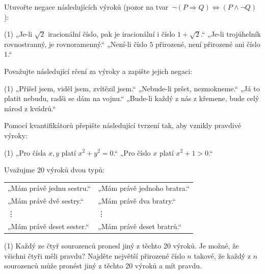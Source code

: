 \documentclass[12pt,a4paper]{article}
\begin{document}
\begin{exercise}
Utuvořte negace následujících výroků (pozor na tvar \,$\neg(P\Rightarrow Q)\Leftrightarrow (P\land\neg Q)$):
\begin{tasks}(1)
\task „Je-li $\sqrt{2}$ iracionální číslo, pak je iracionální i číslo $1+\sqrt{2}$.“
\task „Je-li trojúhelník rovnostranný, je rovnoramenný.“
\task „Není-li číslo $5$ přirozené, není přirozené ani číslo $1$.“
\end{tasks}
\end{exercise}

\begin{exercise}
Považujte následující rčení za výroky a zapište jejich negaci:
\begin{tasks}(1)
\task „Přišel jsem, viděl jsem, zvítězil jsem.“  
\task „Nebude-li pršet, nezmokneme.“  
\task „Já to platit nebudu, radši se dám na vojnu.“  
\task „Bude-li každý z nás z křemene, bude celý národ z kvádrů.“  
\end{tasks}
\end{exercise}

\begin{exercise}
Pomocí kvantifikátorů přepište následující tvrzení tak, aby vznikly pravdivé výroky:
\begin{tasks}(1)
\task „Pro čísla $x,y$ platí $x^2 + y^2 = 0$.“  
\task „Pro číslo $x$ platí $x^2 + 1 > 0$.“  
\end{tasks}
\end{exercise}


\setcounter{section}{2}

\begin{exercise}
Uvažujme 20 výroků dvou typů:

\begin{center}
\begin{tabular}{ll}
„Mám právě jednu sestru.“ & „Mám právě jednoho bratra.“ \\
„Mám právě dvě sestry.“   & „Mám právě dva bratry.“    \\
\vdots                    & \vdots                     \\
„Mám právě deset sester.“ & „Mám právě deset bratrů.“  \\
\end{tabular}
\end{center}

\begin{tasks}(1)
    \task Každý ze čtyř sourozenců pronesl jiný z těchto 20 výroků.  
          Je možné, že všichni čtyři měli pravdu?
    \task Najděte největší přirozené číslo $n$ takové, že každý z $n$ sourozenců může pronést jiný z těchto 20 výroků a mít pravdu.
\end{tasks}
\end{exercise}
\end{document}
